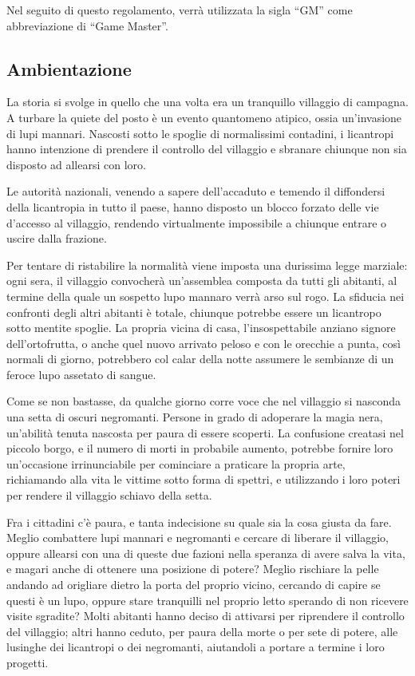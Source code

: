 \documentclass[a4paper,10pt]{article}
\begin{document}
Nel seguito di questo regolamento, verrà utilizzata la sigla ``GM'' come abbreviazione di ``Game Master''.

\subsection{Ambientazione}

La storia si svolge in quello che una volta era un tranquillo villaggio di campagna. A turbare la quiete del posto è un evento quantomeno atipico, ossia un'invasione di lupi mannari. Nascosti sotto le spoglie di normalissimi contadini, i licantropi hanno intenzione di prendere il controllo del villaggio e sbranare chiunque non sia disposto ad allearsi con loro.

Le autorità nazionali, venendo a sapere dell'accaduto e temendo il diffondersi della licantropia in tutto il paese, hanno disposto un blocco forzato delle vie d'accesso al villaggio, rendendo virtualmente impossibile a chiunque entrare o uscire dalla frazione.

Per tentare di ristabilire la normalità viene imposta una durissima legge marziale: ogni sera, il villaggio convocherà un'assemblea composta da tutti gli abitanti, al termine della quale un sospetto lupo mannaro verrà arso sul rogo. La sfiducia nei confronti degli altri abitanti è totale, chiunque potrebbe essere un licantropo sotto mentite spoglie. La propria vicina di casa, l'insospettabile anziano signore dell'ortofrutta, o anche quel nuovo arrivato peloso e con le orecchie a punta, così normali di giorno, potrebbero col calar della notte assumere le sembianze di un feroce lupo assetato di sangue.

Come se non bastasse, da qualche giorno corre voce che nel villaggio si nasconda una setta di oscuri negromanti. Persone in grado di adoperare la magia nera, un'abilità tenuta nascosta per paura di essere scoperti. La confusione creatasi nel piccolo borgo, e il numero di morti in probabile aumento, potrebbe fornire loro un'occasione irrinunciabile per cominciare a praticare la propria arte, richiamando alla vita le vittime sotto forma di spettri, e utilizzando i loro poteri per rendere il villaggio schiavo della setta.

Fra i cittadini c'è paura, e tanta indecisione su quale sia la cosa giusta da fare. Meglio combattere lupi mannari e negromanti e cercare di liberare il villaggio, oppure allearsi con una di queste due fazioni nella speranza di avere salva la vita, e magari anche di ottenere una posizione di potere? Meglio rischiare la pelle andando ad origliare dietro la porta del proprio vicino, cercando di capire se questi è un lupo, oppure stare tranquilli nel proprio letto sperando di non ricevere visite sgradite? Molti abitanti hanno deciso di attivarsi per riprendere il controllo del villaggio; altri hanno ceduto, per paura della morte o per sete di potere, alle lusinghe dei licantropi o dei negromanti, aiutandoli a portare a termine i loro progetti.
\end{document}

